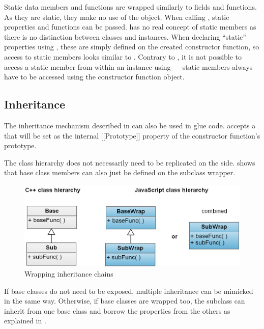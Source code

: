 Static data members and functions are wrapped similarly to fields and functions. As they are static, they make no use of the  object. When calling , static properties and functions can be passed.  has no real concept of static members as there is no distinction between classes and instances. When declaring ``static'' properties using , these are simply defined on the created \linebreak constructor function, so access to static members looks similar to . Contrary to , it is not possible to access a static member from within an instance \linebreak using  --- static members always have to be accessed using the constructor function object.

\subsection{Inheritance}

The inheritance mechanism described in  can also be used in glue code.  accepts a  that will be set as the internal [[Prototype]] property of the constructor function's prototype.

The  class hierarchy does not necessarily need to be replicated on the  side.  shows that base class members can also just be defined on the subclass wrapper.

\begin{figure}[h] %
	\centering
		\includegraphics[scale=0.3]{Images/InheritanceWrapping.png}
	\caption{Wrapping inheritance chains}
	\label{fig:InheritanceWrapping}
\end{figure}

If base classes do not need to be exposed, multiple inheritance can be mimicked in the same way. Otherwise, if base classes are wrapped too, the subclass can inherit from one base class and borrow the properties from the others as explained in .

